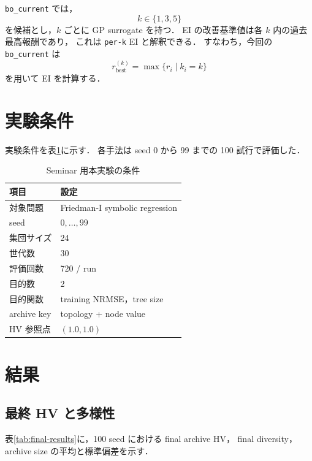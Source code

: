 \documentclass[a4paper,11pt]{ltjsarticle}
\begin{document}
\texttt{bo\_current} では，
\[
  k\in\{1,3,5\}
\]
を候補とし，\(k\) ごとに GP surrogate を持つ．
EI の改善基準値は各 \(k\) 内の過去最高報酬であり，
これは \texttt{per-k} EI と解釈できる．
すなわち，今回の \texttt{bo\_current} は
\[
  r_{\mathrm{best}}^{(k)}
  =
  \max\{r_i\mid k_i=k\}
\]
を用いて EI を計算する．

\section{実験条件}

実験条件を表\ref{tab:experiment-setting}に示す．
各手法は seed 0 から 99 までの 100 試行で評価した．

\begin{table}[htbp]
\centering
\caption{Seminar 用本実験の条件}
\label{tab:experiment-setting}
\begin{tabular}{ll}
\toprule
項目 & 設定 \\
\midrule
対象問題 & Friedman-I symbolic regression \\
seed & \(0,\ldots,99\) \\
集団サイズ & 24 \\
世代数 & 30 \\
評価回数 & 720 / run \\
目的数 & 2 \\
目的関数 & training NRMSE，tree size \\
archive key & topology + node value \\
HV 参照点 & \((1.0,1.0)\) \\
\bottomrule
\end{tabular}
\end{table}

\section{結果}

\subsection{最終 HV と多様性}

表\ref{tab:final-results}に，100 seed における final archive HV，
final diversity，archive size の平均と標準偏差を示す．
\end{document}

